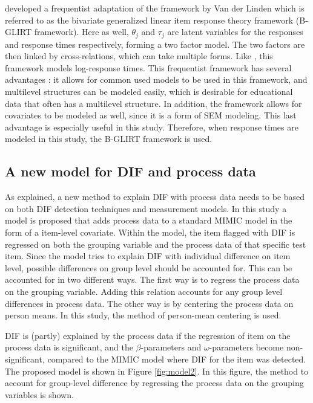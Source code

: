 \documentclass{interact}
\begin{document}
\textcite{molenaar2015generalized} developed a frequentist adaptation of the framework by Van der Linden which is referred to as the bivariate generalized linear item response theory framework (B-GLIRT framework). Here as well, $\theta_j$ and $\tau_j$ are latent variables for the responses and response times respectively, forming a two factor model. The two factors are then linked by cross-relations, which can take multiple forms. Like \textcite{van2007hierarchical}, this framework models log-response times. This frequentist framework has several advantages \parencite{molenaar2015generalized}: it allows for common used models to be used in this framework, and multilevel structures can be modeled easily, which is desirable for educational data that often has a multilevel structure. In addition, the framework allows for covariates to be modeled as well, since it is a form of SEM modeling. This last advantage is especially useful in this study. Therefore, when response times are modeled in this study, the B-GLIRT framework is used.

\subsection{A new model for DIF and process data}
\label{sec: newmodel}
As explained, a new method to explain DIF with process data needs to be based on both DIF detection techniques and measurement models. In this study a model is proposed that adds process data to a standard MIMIC model in the form of a item-level covariate. Within the model, the item flagged with DIF is regressed on both the grouping variable and the process data of that specific test item. Since the model tries to explain DIF with individual difference on item level, possible differences on group level should be accounted for. This can be accounted for in two different ways. The first way is to regress the process data on the grouping variable. Adding this relation accounts for any group level differences in process data. The other way is by centering the process data on person means. In this study, the method of person-mean centering is used.

DIF is (partly) explained by the process data if the regression of item on the process data is significant, and the $\beta$-parameters and $\omega$-parameters become non-significant, compared to the MIMIC model where DIF for the item was detected. The proposed model is shown in Figure \ref{fig:model2}. In this figure, the method to account for group-level difference by regressing the process data on the grouping variables is shown.
\end{document}
